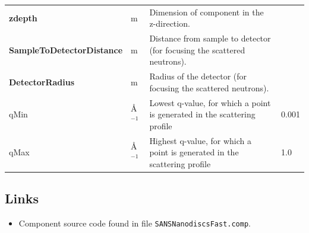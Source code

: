 \begin{longtable}{p{}p{}p{}p{}}
\textbf{zdepth} & m & Dimension of component in the z-direction. &  \\
\textbf{SampleToDetectorDistance} & m & Distance from sample to detector (for focusing the scattered neutrons). &  \\
\textbf{DetectorRadius} & m & Radius of the detector (for focusing the scattered neutrons). &  \\
qMin & \AA{}$^{-1}$ & Lowest q-value, for which a point is generated in the scattering profile & 0.001 \\
qMax & \AA{}$^{-1}$ & Highest q-value, for which a point is generated in the scattering profile & 1.0 \\
\bottomrule
\end{longtable}

\subsection*{Links}
\begin{itemize}
  \item Component source code found in file \texttt{SANSNanodiscsFast.comp}.
\end{itemize}
